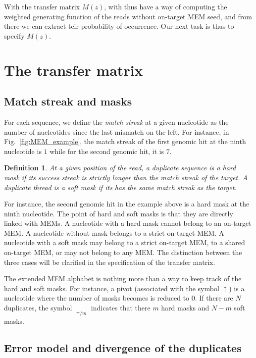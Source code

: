 \documentclass{article}
\newtheorem{definition}{Definition}
\begin{document}
With the transfer matrix $M(z)$, with thus have a way of computing the
weighted generating function of the reads without on-target MEM seed, and
from there we can extract teir probability of occurrence. Our next task is
thus to specify $M(z)$.



\section{The transfer matrix}

\subsection{Match streak and masks}

For each sequence, we define the \emph{match streak} at a given nucleotide
as the number of nucleotides since the last mismatch on the left. For
instance, in Fig.~\ref{fig:MEM_example}, the match streak of the first
genomic hit at the ninth nucleotide is $1$ while for the second genomic
hit, it is $7$.

\begin{definition}
At a given position of the read, a duplicate sequence is a \emph{hard
mask} if its success streak is strictly longer than the match streak of
the target. A duplicate thread is a \emph{soft mask} if its has the same
match streak as the target.
\end{definition}

For instance, the second genomic hit in the example above is a hard mask
at the ninth nucleotide. The point of hard and soft masks is that they are
directly linked with MEMs. A nucleotide with a hard mask cannot belong to
an on-target MEM. A nucleotide without mask belongs to a strict on-target
MEM. A nucleotide with a soft mask may belong to a strict on-target MEM,
to a shared on-target MEM, or may not belong to any MEM. The distinction
between the three cases will be clarified in the specification of the
transfer matrix.

The extended MEM alphabet is nothing more than a way to keep track of the
hard and soft masks. For instance, a pivot (associated with the symbol
$\uparrow$) is a nucleotide where the number of masks becomes is reduced
to 0. If there are $N$ duplicates, the symbol $\downarrow_{/m}$ indicates
that there $m$ hard masks and $N-m$ soft masks.


\subsection{Error model and divergence of the duplicates}
\end{document}
